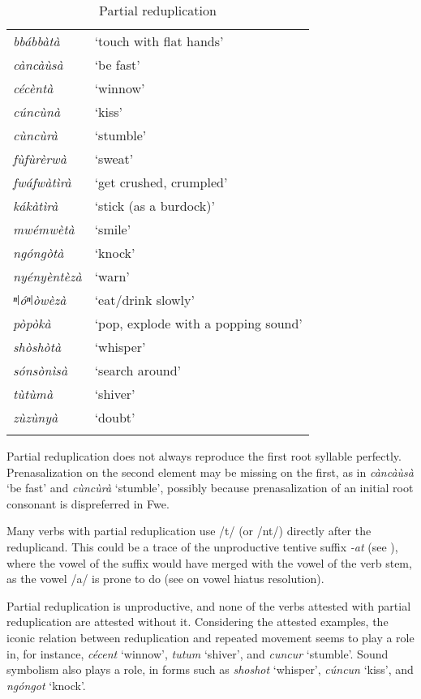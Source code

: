 \begin{table}
\label{bkm:Ref489606874}\caption{\label{tab:6:13}Partial reduplication}

\begin{tabular}{ll}
\lsptoprule
{\itshape bbábbàtà} & ‘touch with flat hands’\\
{\itshape càncàùsà} & ‘be fast’\\
{\itshape cécèntà} & ‘winnow’\\
{\itshape cúncùnà} & ‘kiss’\\
{\itshape cùncùrà} & ‘stumble’\\
{\itshape fùfùrèrwà} & ‘sweat’\\
{\itshape fwáfwàtìrà} & ‘get crushed, crumpled’\\
{\itshape kákàtìrà} & ‘stick (as a burdock)’\\
{\itshape mwémwètà} & ‘smile’\\
{\itshape ngóngòtà} & ‘knock’\\
{\itshape nyényèntèzà} & ‘warn’\\
{\itshape ⁿǀóⁿǀòwèzà} & ‘eat/drink slowly’\\
{\itshape pòpòkà} & ‘pop, explode with a popping sound’\\
{\itshape shòshòtà} & ‘whisper’\\
{\itshape sónsònìsà} & ‘search around’\\
{\itshape tùtùmà} & ‘shiver’\\
{\itshape zùzùnyà} & ‘doubt’\\
\lspbottomrule
\end{tabular}
\end{table}

Partial reduplication does not always reproduce the first root syllable perfectly. Prenasalization on the second element may be missing on the first, as in \textit{càncàùsà} ‘be fast’ and \textit{cùncùrà} ‘stumble’, possibly because prenasalization of an initial root consonant is dispreferred in Fwe.

Many verbs with partial reduplication use /t/ (or /nt/) directly after the reduplicand. This could be a trace of the unproductive tentive suffix \textit{-at} (see ), where the vowel of the suffix would have merged with the vowel of the verb stem, as the vowel /a/ is prone to do (see  on vowel hiatus resolution).

Partial reduplication is unproductive, and none of the verbs attested with partial reduplication are attested without it. Considering the attested examples, the iconic relation between reduplication and repeated movement seems to play a role in, for instance, \textit{cécent} ‘winnow’, \textit{tutum} ‘shiver’, and \textit{cuncur} ‘stumble’. Sound symbolism also plays a role, in forms such as \textit{shoshot} ‘whisper’, \textit{cúncun} ‘kiss’, and \textit{ngóngot} ‘knock’.

